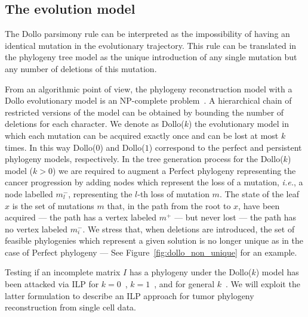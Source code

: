 \documentclass[a4paper,USenglish]{article}
\newcommand{\ie}{\emph{i.e.}}
\theoremstyle{definition}
\begin{document}
\subsection{The evolution model}
\label{sec:intro_dollok}
The Dollo parsimony rule can be interpreted as the impossibility of
having an identical mutation in the evolutionary trajectory.  This
rule can be translated in the phylogeny tree model as the unique
introduction of any single mutation but any number of deletions of
this mutation.

From an algorithmic point of view, the phylogeny reconstruction model
with a Dollo evolutionary model is an NP-complete
problem~\cite{BKW95,DAY198633}.  A hierarchical chain of restricted
versions of the model can be obtained by bounding the number of
deletions for each character.  We denote as Dollo($k$) the
evolutionary model in which each mutation can be acquired exactly once
and can be lost at most $k$ times.  In this way Dollo($0$) and
Dollo($1$) correspond to the perfect and persistent phylogeny models,
respectively.  In the tree generation process for the Dollo($k$) model
($k>0$) we are required to augment a Perfect phylogeny representing
the cancer progression by adding nodes which represent the loss of a
mutation, \ie, a node labelled $m^-_l$, representing the $l$-th loss
of mutation $m$.  The state of the leaf $x$ is the set of mutations
$m$ that, in the path from the root to $x$, have been acquired --- the
path has a vertex labeled $m^{+}$ --- but never lost --- the path has
no vertex labeled $m_{i}^{-}$.  We stress that, when deletions are
introduced, the set of feasible phylogenies which represent a given
solution is no longer unique as in the case of Perfect phylogeny ---
See Figure~\ref{fig:dollo_non_unique} for an example.

Testing if an incomplete matrix $I$ has a phylogeny under the
Dollo($k$) model has been attacked via ILP for
$k=0$~\cite{Gusfield2007}, $k=1$~\cite{gusfield_persistent_2015}, and
for general $k$~\cite{Bonizzoni:2017:BPP:3107411.3107441}.  We will
exploit the latter formulation to describe an ILP approach for tumor
phylogeny reconstruction from single cell data.
\end{document}
